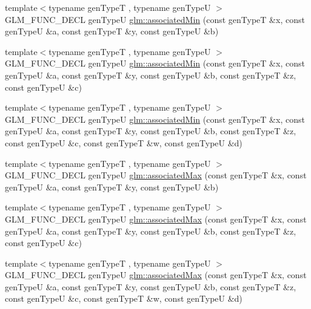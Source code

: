 \begin{DoxyCompactItemize}
\item 
{\footnotesize template$<$typename gen\+TypeT , typename gen\+TypeU $>$ }\\G\+L\+M\+\_\+\+F\+U\+N\+C\+\_\+\+D\+E\+CL gen\+TypeU \hyperlink{group__gtx__associated__min__max_ga47bdb60409768f3d315bc5a1f739810a}{glm\+::associated\+Min} (const gen\+TypeT \&x, const gen\+TypeU \&a, const gen\+TypeT \&y, const gen\+TypeU \&b)
\item 
{\footnotesize template$<$typename gen\+TypeT , typename gen\+TypeU $>$ }\\G\+L\+M\+\_\+\+F\+U\+N\+C\+\_\+\+D\+E\+CL gen\+TypeU \hyperlink{group__gtx__associated__min__max_ga3f696c0cce55211f333edb7336cc9cb8}{glm\+::associated\+Min} (const gen\+TypeT \&x, const gen\+TypeU \&a, const gen\+TypeT \&y, const gen\+TypeU \&b, const gen\+TypeT \&z, const gen\+TypeU \&c)
\item 
{\footnotesize template$<$typename gen\+TypeT , typename gen\+TypeU $>$ }\\G\+L\+M\+\_\+\+F\+U\+N\+C\+\_\+\+D\+E\+CL gen\+TypeU \hyperlink{group__gtx__associated__min__max_ga45618e13844d00046a0fe3409ae7513e}{glm\+::associated\+Min} (const gen\+TypeT \&x, const gen\+TypeU \&a, const gen\+TypeT \&y, const gen\+TypeU \&b, const gen\+TypeT \&z, const gen\+TypeU \&c, const gen\+TypeT \&w, const gen\+TypeU \&d)
\item 
{\footnotesize template$<$typename gen\+TypeT , typename gen\+TypeU $>$ }\\G\+L\+M\+\_\+\+F\+U\+N\+C\+\_\+\+D\+E\+CL gen\+TypeU \hyperlink{group__gtx__associated__min__max_gaee554495240b93d80492b3d2312ede1d}{glm\+::associated\+Max} (const gen\+TypeT \&x, const gen\+TypeU \&a, const gen\+TypeT \&y, const gen\+TypeU \&b)
\item 
{\footnotesize template$<$typename gen\+TypeT , typename gen\+TypeU $>$ }\\G\+L\+M\+\_\+\+F\+U\+N\+C\+\_\+\+D\+E\+CL gen\+TypeU \hyperlink{group__gtx__associated__min__max_ga20218dcc769c76adf0c3e9aad21c64a4}{glm\+::associated\+Max} (const gen\+TypeT \&x, const gen\+TypeU \&a, const gen\+TypeT \&y, const gen\+TypeU \&b, const gen\+TypeT \&z, const gen\+TypeU \&c)
\item 
{\footnotesize template$<$typename gen\+TypeT , typename gen\+TypeU $>$ }\\G\+L\+M\+\_\+\+F\+U\+N\+C\+\_\+\+D\+E\+CL gen\+TypeU \hyperlink{group__gtx__associated__min__max_ga23f2bce9c1d6f775cd1f7bf36525286e}{glm\+::associated\+Max} (const gen\+TypeT \&x, const gen\+TypeU \&a, const gen\+TypeT \&y, const gen\+TypeU \&b, const gen\+TypeT \&z, const gen\+TypeU \&c, const gen\+TypeT \&w, const gen\+TypeU \&d)
\end{DoxyCompactItemize}


